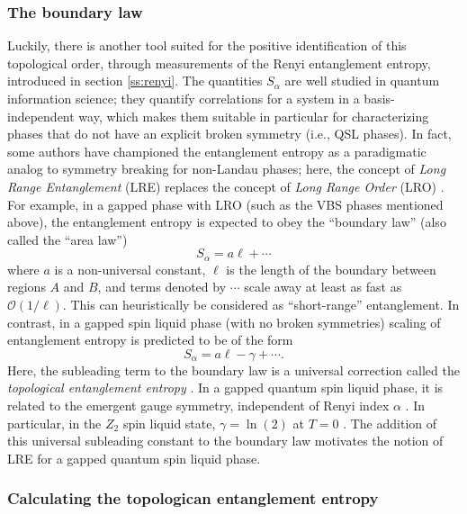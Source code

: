 \documentclass[10pt,pre,aps,twocolumn,showpacs,superscriptaddress,floatfix]{revtex4-1}
\begin{document}
\subsubsection{The boundary law}

Luckily, there is another tool suited for the positive identification of this topological order, through measurements of the Renyi entanglement entropy, introduced in section \ref{ss:renyi}.  The quantities $S_{\alpha}$ are well studied in quantum information science; they quantify correlations for a system in a basis-independent way, which makes them suitable in particular for characterizing phases that do not have an explicit broken symmetry (i.e., QSL phases).  In fact, some authors have championed the entanglement entropy as a paradigmatic analog to symmetry breaking for non-Landau phases; here, the concept of {\it Long Range Entanglement} (LRE) replaces the concept of {\it Long Range Order} (LRO) \cite{Wenbook}.  For example, in a gapped phase with LRO (such as the VBS phases mentioned above), the entanglement entropy is expected to obey the ``boundary law'' (also called the ``area law'')
\begin{equation} 
S_{\alpha} = a\ell + \cdots \label{arealaw}
\end{equation}
where $a$ is a non-universal constant, $\ell$ is the length of the boundary between regions $A$ and $B$, and terms denoted by $\cdots$ scale away at least as fast as $\mathcal{O} (1/\ell)$.  This can heuristically be considered as ``short-range'' entanglement.  In contrast, in a gapped spin liquid phase (with no broken symmetries)
scaling of entanglement entropy is predicted to be of the form
\begin{equation}
S_{\alpha} = a \ell - \gamma + \cdots \label{areaL}.
\end{equation}
 Here, the subleading term to the boundary law is a universal correction called the {\it topological entanglement entropy} \cite{Alioscia1,Alioscia2,LW,KP}.  In a gapped quantum spin liquid phase, it is related to the emergent gauge symmetry, independent of Renyi index $\alpha$ \cite{Flammia}.  In particular, in the $Z_2$ spin liquid state, $\gamma =  \ln(2)$ at $T=0$ \cite{LW}.   The addition of this universal subleading constant to the boundary law motivates the notion of LRE for a gapped quantum spin liquid phase.

\subsubsection{Calculating the topologican entanglement entropy}
\end{document}
